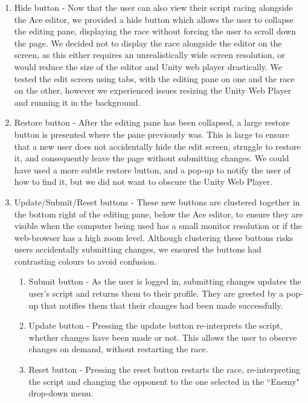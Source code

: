 \begin{enumerate}
\item Hide button - Now that the user can also view their script racing alongside the Ace editor, we provided a hide button which allows the user to collapse the editing pane, displaying the race without forcing the user to scroll down the page. We decided not to display the race alongside the editor on the screen, as this either requires an unrealistically wide screen resolution, or would reduce the size of the editor and Unity web player drastically. We tested the edit screen using tabs, with the editing pane on one and the race on the other, however we experienced issues resizing the  Unity Web Player and running it in the background.
\item Restore button - After the editing pane has been collapsed, a large restore button is presented where the pane previously was. This is large to ensure that a new user does not accidentally hide the edit screen, struggle to restore it, and consequently leave the page without submitting changes. We could have used a more subtle restore button, and a  pop-up to notify the user of how to find it, but we did not want to obscure the Unity Web Player.
\item Update/Submit/Reset buttons - These new buttons are clustered together in the bottom right of the editing pane, below the Ace editor, to ensure they are visible when the computer being used has a small monitor resolution or if the web-browser has a high zoom level. Although clustering these buttons risks users accidentally submitting changes, we ensured the buttons had contrasting colours to avoid confusion.
	\begin{enumerate}
	\item Submit button - As the user is logged in, submitting changes updates the user's script and returns them to their profile. They are greeted by a pop-up that notifies them that their changes had been made successfully.
	\item Update button - Pressing the update button re-interprets the script, whether changes have been made or not. This allows the user to observe changes on demand, without restarting the race. 
	\item Reset button - Pressing the reset button restarts the race, re-interpreting the script and changing the opponent to the one selected in the ``Enemy" drop-down menu.
	\end{enumerate}
\end{enumerate}

